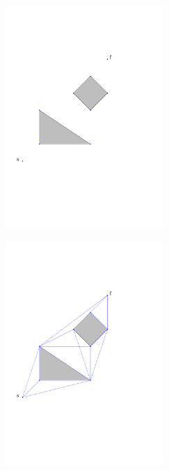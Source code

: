 \begin{figure}[H]
	\caption{Example of visibility graph}
	\begin{subfigure}{.5\textwidth}
		\includegraphics[width=6cm]{figures/visibilitygraph1.pdf}
		\caption{}
	\label{fig:visibilitygraph1}
	\end{subfigure}
	\begin{subfigure}{.5\textwidth}
		\includegraphics[width=6cm]{figures/visibilitygraph.pdf}
		\caption{}
		\label{fig:visibilitygraph2}
	\end{subfigure}
	\label{visibilitygraph}
\end{figure}

